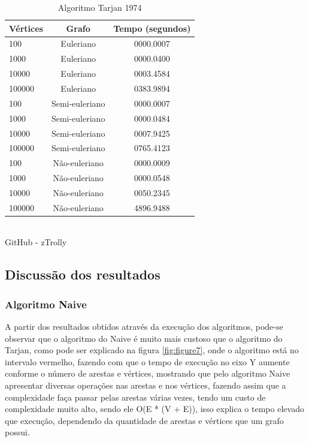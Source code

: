 \newpage
\begin{table}[htb]
	\centering
	\caption{\hspace{0.1cm} Algoritmo Tarjan 1974}
	\vspace{-0.3cm} %
	\label{tab:tabela2}
	\begin{tabular}{l|c|c}
  \hline
    \textbf{Vértices}	& \textbf{Grafo} & \textbf{Tempo (segundos)} \\
    \hline
     100	 & Euleriano      &  0000.0007  \\
     1000	 & Euleriano      &  0000.0400  \\
     10000	 & Euleriano      &  0003.4584  \\
     100000  & Euleriano      &  0383.9894  \\
     100	 & Semi-euleriano &  0000.0007  \\
     1000	 & Semi-euleriano &  0000.0484  \\
     10000	 & Semi-euleriano &  0007.9425  \\
     100000  & Semi-euleriano &  0765.4123  \\
     100	 & Não-euleriano  &  0000.0009  \\
     1000	 & Não-euleriano  &  0000.0548  \\
     10000	 & Não-euleriano  &  0050.2345  \\
     100000  & Não-euleriano  &  4896.9488  \\

     \hline
 \end{tabular}
 	\vspace{.1cm}  %
	\small
	{\footnotesize\\ GitHub - zTrolly}
\end{table}

\subsection{\esp Discussão dos resultados}
\subsubsection{Algoritmo Naive}
A partir dos resultados obtidos através da execução dos algoritmos, pode-se observar que o algoritmo do Naive é muito mais custoso que o algoritmo do Tarjan, como pode ser explicado na figura \ref{fig:figure7}, onde o algoritmo está no intervalo vermelho, fazendo com que o tempo de execução no eixo Y aumente conforme o número de arestas e vértices, mostrando que pelo algoritmo Naive apresentar diversas operações nas arestas e nos vértices, fazendo assim que a complexidade faça passar pelas arestas várias vezes, tendo um custo de complexidade muito alto, sendo ele O(E * (V + E)), isso explica o tempo elevado que execução, dependendo da quantidade de arestas e vértices que um grafo possui.

